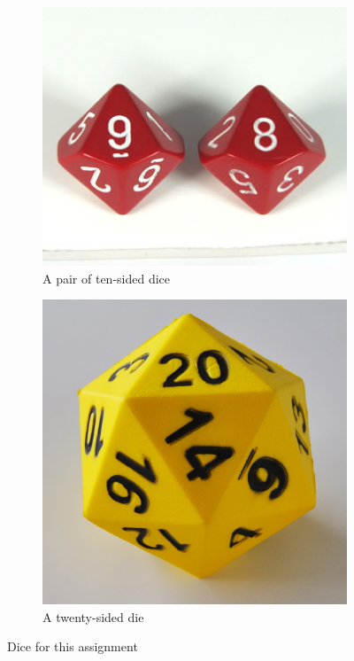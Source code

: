 \documentclass[12pt,letterpaper]{article}
\theoremstyle{definition}
\begin{document}
\begin{figure}[h]
\centering
\begin{subfigure}[b]{0.3\textwidth}
\centering
\includegraphics[width=\textwidth]{images/d10pair.jpg}
\caption{A pair of ten-sided dice}
\end{subfigure}
\quad
\begin{subfigure}[b]{0.3\textwidth}
\centering
\includegraphics[width=\textwidth]{images/d20.jpg}
\caption{A twenty-sided die}
\end{subfigure}
\caption{Dice for this assignment}
\end{figure}
\end{document}
